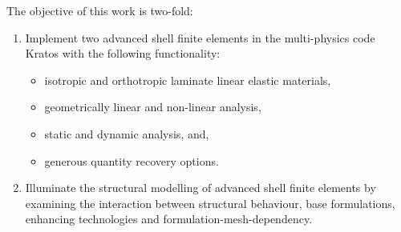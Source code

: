 The objective of this work is two-fold:
\begin{enumerate}
	\item Implement two advanced shell finite elements in the multi-physics code Kratos with the following functionality:
	\begin{itemize}
		\item isotropic and orthotropic laminate linear elastic materials,
		\item geometrically linear and non-linear analysis,
		\item static and dynamic analysis, and,
		\item generous quantity recovery options.\\
	\end{itemize}

	\item Illuminate the structural modelling of advanced shell finite elements by examining the interaction between structural behaviour, base formulations, enhancing technologies and formulation-mesh-dependency.
\end{enumerate}


